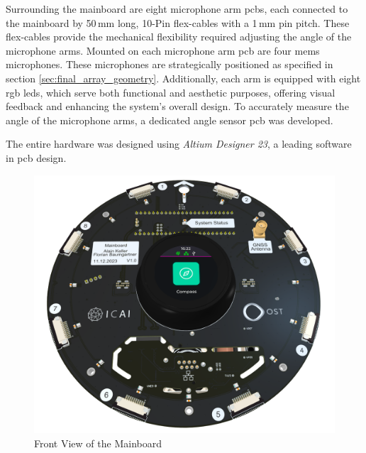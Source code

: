 Surrounding the mainboard are eight microphone arm \acrshort{pcb}s, each connected to the mainboard by 50\,mm long, 10-Pin flex-cables with a 1\,mm pin pitch.
These flex-cables provide the mechanical flexibility required adjusting the angle of the microphone arms.
Mounted on each microphone arm \acrshort{pcb} are four \acrshort{mems} microphones.
These microphones are strategically positioned as specified in section \ref{sec:final_array_geometry}.
Additionally, each arm is equipped with eight \acrshort{rgb} \acrshort{led}s, which serve both functional and aesthetic purposes, offering visual feedback and enhancing the system's overall design.
To accurately measure the angle of the microphone arms, a dedicated angle sensor \acrshort{pcb} was developed.

The entire hardware was designed using \textit{Altium Designer 23}, a leading software in \acrshort{pcb} design.
\begin{figure}[h!]
	\centering
	\includegraphics[width=1.0\textwidth]{images/6_design_final/Mainboard_Front_Display.png}
	\caption{Front View of the Mainboard}
	\label{fig:mainboard_front}
\end{figure}
\newpage

